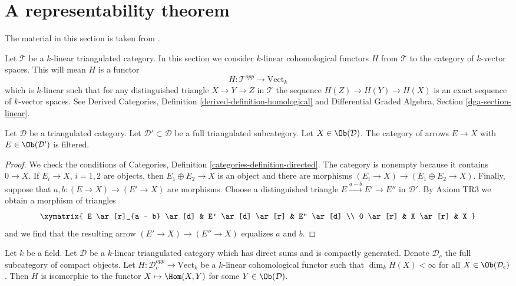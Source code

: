 \section{A representability theorem}
\label{section-bondal-van-den-bergh}

\noindent
The material in this section is taken from \cite{BvdB}.

\medskip\noindent
Let $\mathcal{T}$ be a $k$-linear triangulated category.
In this section we consider $k$-linear cohomological functors
$H$ from $\mathcal{T}$ to the category of $k$-vector spaces.
This will mean $H$ is a functor
$$
H : \mathcal{T}^{opp} \longrightarrow \text{Vect}_k
$$
which is $k$-linear such that for any distinguished triangle
$X \to Y \to Z$ in $\mathcal{T}$ the sequence $H(Z) \to H(Y) \to H(X)$
is an exact sequence of $k$-vector spaces. See
Derived Categories, Definition \ref{derived-definition-homological}
and Differential Graded Algebra, Section \ref{dga-section-linear}.

\begin{lemma}
\label{lemma-maps-from-compact-filtered}
Let $\mathcal{D}$ be a triangulated category. Let
$\mathcal{D}' \subset \mathcal{D}$ be a full triangulated subcategory. Let
$X \in \Ob(\mathcal{D})$. The category of arrows $E \to X$ with
$E \in \Ob(\mathcal{D}')$ is filtered.
\end{lemma}

\begin{proof}
We check the conditions of
Categories, Definition \ref{categories-definition-directed}.
The category is nonempty because it contains $0 \to X$.
If $E_i \to X$, $i = 1, 2$ are objects, then $E_1 \oplus E_2 \to X$
is an object and there are morphisms $(E_i \to X) \to (E_1 \oplus E_2 \to X)$.
Finally, suppose that $a, b : (E \to X) \to (E' \to X)$ are morphisms.
Choose a distinguished triangle $E \xrightarrow{a - b} E' \to E''$
in $\mathcal{D}'$. By Axiom TR3 we obtain a morphism of triangles
$$
\xymatrix{
E \ar[r]_{a - b} \ar[d] &
E' \ar[d] \ar[r] & E'' \ar[d] \\
0 \ar[r] &
X \ar[r] &
X
}
$$
and we find that the resulting arrow $(E' \to X) \to (E'' \to X)$
equalizes $a$ and $b$.
\end{proof}

\begin{lemma}
\label{lemma-van-den-bergh}
\begin{reference}
\cite[Lemma 2.14]{CKN}
\end{reference}
Let $k$ be a field. Let $\mathcal{D}$ be a $k$-linear triangulated category
which has direct sums and is compactly generated.
Denote $\mathcal{D}_c$ the full
subcategory of compact objects. Let $H : \mathcal{D}_c^{opp} \to \text{Vect}_k$
be a $k$-linear cohomological functor such that
$\dim_k H(X) < \infty$ for all $X \in \Ob(\mathcal{D}_c)$.
Then $H$ is isomorphic to the functor $X \mapsto \Hom(X, Y)$
for some $Y \in \Ob(\mathcal{D})$.
\end{lemma}

